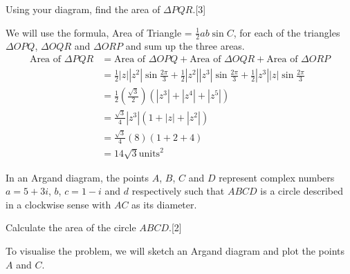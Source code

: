 \documentclass[12pt, a4 paper]{article}
\begin{document}
\begin{outline}[enumerate]
	\2 Using your diagram, find the area of $\Delta PQR$.\hfill[3]
	\begin{answer}
		We will use the formula, Area of Triangle = $\frac{1}{2}ab\sin C$, for each of the triangles $\Delta OPQ$, $\Delta OQR$ and $\Delta ORP$ and sum up the three areas.
		\begin{align*}
			\textrm{Area of }\Delta PQR & = \textrm{Area of }\Delta OPQ + \textrm{Area of }\Delta OQR + \textrm{Area of }\Delta ORP                                      \\
			                            & = \frac{1}{2}|z||z^2|\sin{\frac{2\pi}{3}} + \frac{1}{2}|z^2||z^3|\sin{\frac{2\pi}{3}} +\frac{1}{2}|z^3||z|\sin{\frac{2\pi}{3}} \\
			                            & = \frac{1}{2}(\frac{\sqrt{3}}{2})(|z^3| + |z^4| + |z^5|)                                                                       \\
			                            & = \frac{\sqrt3}{4}|z^3|(1+|z|+|z^2|)                                                                                           \\
			                            & = \frac{\sqrt3}{4}(8)(1+2+4)                                                                                                   \\
			                            & = 14\sqrt{3}\textrm{units}^2                                                                                                   
		\end{align*}
	\end{answer} 
			
	\1 In an Argand diagram, the points $A$, $B$, $C$ and $D$ represent complex numbers $a=5+3i$, $b$, $c=1-i$ and $d$ respectively such that $ABCD$ is a circle described in a clockwise sense with $AC$ as its diameter. %
		    
	\2 Calculate the area of the circle $ABCD$.\hfill[2]
	\begin{answer}
		To visualise the problem, we will sketch an Argand diagram and plot the points $A$ and $C$.\\
				        

\end{answer}
\end{outline}
\end{document}
